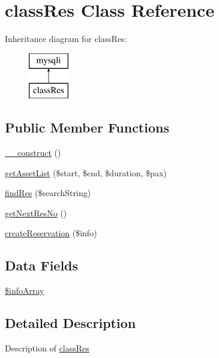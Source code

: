\hypertarget{classclass_res}{}\section{class\+Res Class Reference}
\label{classclass_res}
Inheritance diagram for class\+Res\+:\begin{figure}[H]
\begin{center}
\leavevmode
\includegraphics[height=2.000000cm]{classclass_res}
\end{center}
\end{figure}
\subsection*{Public Member Functions}
\begin{DoxyCompactItemize}
\item 
\hyperlink{classclass_res_a095c5d389db211932136b53f25f39685}{\+\_\+\+\_\+construct} ()
\item 
\hyperlink{classclass_res_ae8167da71e306192c7c2b3e4e9780383}{get\+Asset\+List} (\$start, \$end, \$duration, \$pax)
\item 
\hyperlink{classclass_res_a8556a92bb6f8fbbdb406cd29e6a6bf9f}{find\+Res} (\$search\+String)
\item 
\hyperlink{classclass_res_a5761febd4e36158c6513a63b9b862dd9}{get\+Next\+Res\+No} ()
\item 
\hyperlink{classclass_res_a6c5d3040d1db2b9d8000117b5b2539b7}{create\+Reservation} (\$info)
\end{DoxyCompactItemize}
\subsection*{Data Fields}
\begin{DoxyCompactItemize}
\item 
\hyperlink{classclass_res_a4d91186c9ddc5fdec9eddf319a4ab85e}{\$info\+Array}
\end{DoxyCompactItemize}


\subsection{Detailed Description}
Description of \hyperlink{classclass_res}{class\+Res}

